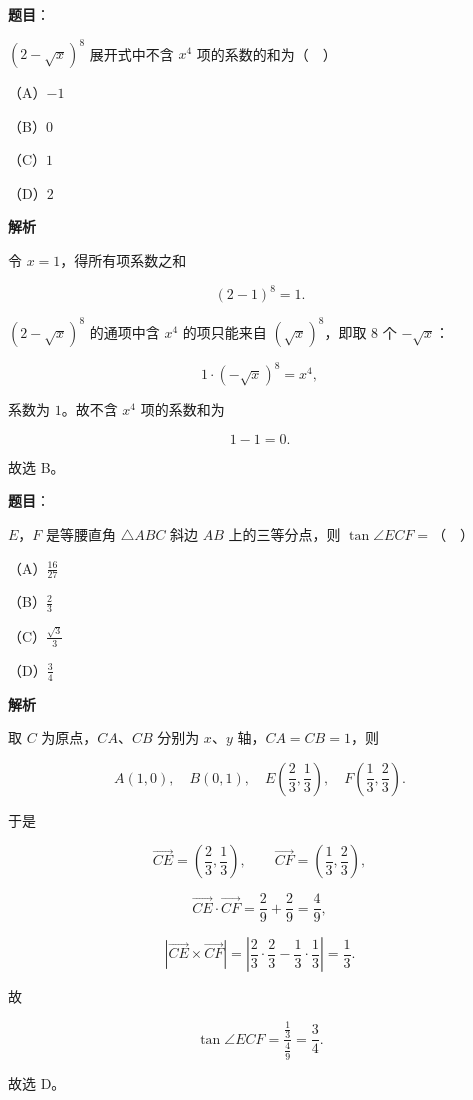 \begin{answer}

\textbf{题目}：

$(2-\sqrt x)^8$ 展开式中不含 $x^4$ 项的系数的和为（　）

（A）$-1$

（B）$0$

（C）$1$

（D）$2$

\textbf{解析}

令 $x=1$，得所有项系数之和

\nopagebreak[4]
\[(2-1)^8=1.\]

$(2-\sqrt x)^8$ 的通项中含 $x^4$ 的项只能来自 $(\sqrt x)^8$，即取 $8$ 个 $-\sqrt x$：

\nopagebreak[4]
\[1\cdot(-\sqrt x)^8=x^4,\]

系数为 $1$。故不含 $x^4$ 项的系数和为

\nopagebreak[4]
\[1-1=0.\]

故选 B。


\end{answer}
\begin{answer}

\textbf{题目}：

$E$，$F$ 是等腰直角 $\triangle ABC$ 斜边 $AB$ 上的三等分点，则 $\tan\angle ECF=$（　）

（A）$\frac{16}{27}$

（B）$\frac23$

（C）$\frac{\sqrt3}3$

（D）$\frac34$

\textbf{解析}

取 $C$ 为原点，$CA$、$CB$ 分别为 $x$、$y$ 轴，$CA=CB=1$，则

\nopagebreak[4]
\[A(1,0),\quad B(0,1),\quad E\left(\frac23,\frac13\right),\quad F\left(\frac13,\frac23\right).\]

于是

\nopagebreak[4]
\[\overrightarrow{CE}=\left(\frac23,\frac13\right),\qquad \overrightarrow{CF}=\left(\frac13,\frac23\right),\]

\nopagebreak[4]
\[\overrightarrow{CE}\cdot\overrightarrow{CF}=\frac29+\frac29=\frac49,\]

\nopagebreak[4]
\[\left|\overrightarrow{CE}\times\overrightarrow{CF}\right|
=\left|\frac23\cdot\frac23-\frac13\cdot\frac13\right|=\frac13.\]

故

\nopagebreak[4]
\[\tan\angle ECF=\frac{\frac13}{\frac49}=\frac34.\]

故选 D。


\end{answer}
